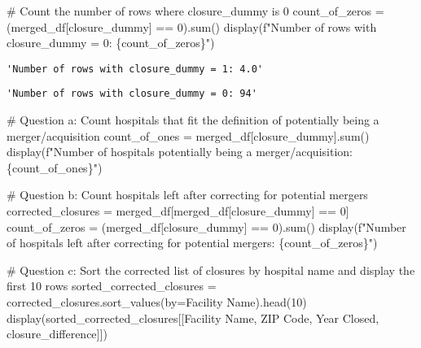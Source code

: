 \documentclass[
  letterpaper,
  DIV=11,
  numbers=noendperiod]{scrartcl}
\newenvironment{Shaded}{\begin{snugshade}}{\end{snugshade}}
\newcommand{\BuiltInTok}[1]{\textcolor[rgb]{0.00,0.23,0.31}{#1}}
\newcommand{\CommentTok}[1]{\textcolor[rgb]{0.37,0.37,0.37}{#1}}
\newcommand{\DecValTok}[1]{\textcolor[rgb]{0.68,0.00,0.00}{#1}}
\newcommand{\NormalTok}[1]{\textcolor[rgb]{0.00,0.23,0.31}{#1}}
\newcommand{\OperatorTok}[1]{\textcolor[rgb]{0.37,0.37,0.37}{#1}}
\newcommand{\SpecialCharTok}[1]{\textcolor[rgb]{0.37,0.37,0.37}{#1}}
\newcommand{\SpecialStringTok}[1]{\textcolor[rgb]{0.13,0.47,0.30}{#1}}
\newcommand{\StringTok}[1]{\textcolor[rgb]{0.13,0.47,0.30}{#1}}
\begin{document}
\begin{Shaded}
\begin{Highlighting}[]
\CommentTok{\# Count the number of rows where closure\_dummy is 0}
\NormalTok{count\_of\_zeros }\OperatorTok{=}\NormalTok{ (merged\_df[}\StringTok{\textquotesingle{}closure\_dummy\textquotesingle{}}\NormalTok{] }\OperatorTok{==} \DecValTok{0}\NormalTok{).}\BuiltInTok{sum}\NormalTok{()}
\NormalTok{display(}\SpecialStringTok{f"Number of rows with closure\_dummy = 0: }\SpecialCharTok{\{}\NormalTok{count\_of\_zeros}\SpecialCharTok{\}}\SpecialStringTok{"}\NormalTok{)}
\end{Highlighting}
\end{Shaded}

\begin{verbatim}
'Number of rows with closure_dummy = 1: 4.0'
\end{verbatim}

\begin{verbatim}
'Number of rows with closure_dummy = 0: 94'
\end{verbatim}

\begin{Shaded}
\begin{Highlighting}[]
\CommentTok{\# Question a: Count hospitals that fit the definition of potentially being a merger/acquisition}
\NormalTok{count\_of\_ones }\OperatorTok{=}\NormalTok{ merged\_df[}\StringTok{\textquotesingle{}closure\_dummy\textquotesingle{}}\NormalTok{].}\BuiltInTok{sum}\NormalTok{()}
\NormalTok{display(}\SpecialStringTok{f"Number of hospitals potentially being a merger/acquisition: }\SpecialCharTok{\{}\NormalTok{count\_of\_ones}\SpecialCharTok{\}}\SpecialStringTok{"}\NormalTok{)}

\CommentTok{\# Question b: Count hospitals left after correcting for potential mergers}
\NormalTok{corrected\_closures }\OperatorTok{=}\NormalTok{ merged\_df[merged\_df[}\StringTok{\textquotesingle{}closure\_dummy\textquotesingle{}}\NormalTok{] }\OperatorTok{==} \DecValTok{0}\NormalTok{]}
\NormalTok{count\_of\_zeros }\OperatorTok{=}\NormalTok{ (merged\_df[}\StringTok{\textquotesingle{}closure\_dummy\textquotesingle{}}\NormalTok{] }\OperatorTok{==} \DecValTok{0}\NormalTok{).}\BuiltInTok{sum}\NormalTok{()}
\NormalTok{display(}\SpecialStringTok{f"Number of hospitals left after correcting for potential mergers: }\SpecialCharTok{\{}\NormalTok{count\_of\_zeros}\SpecialCharTok{\}}\SpecialStringTok{"}\NormalTok{)}

\CommentTok{\# Question c: Sort the corrected list of closures by hospital name and display the first 10 rows}
\NormalTok{sorted\_corrected\_closures }\OperatorTok{=}\NormalTok{ corrected\_closures.sort\_values(by}\OperatorTok{=}\StringTok{\textquotesingle{}Facility Name\textquotesingle{}}\NormalTok{).head(}\DecValTok{10}\NormalTok{)}
\NormalTok{display(sorted\_corrected\_closures[[}\StringTok{\textquotesingle{}Facility Name\textquotesingle{}}\NormalTok{, }\StringTok{\textquotesingle{}ZIP Code\textquotesingle{}}\NormalTok{, }\StringTok{\textquotesingle{}Year Closed\textquotesingle{}}\NormalTok{, }\StringTok{\textquotesingle{}closure\_difference\textquotesingle{}}\NormalTok{]])}
\end{Highlighting}
\end{Shaded}
\end{document}
